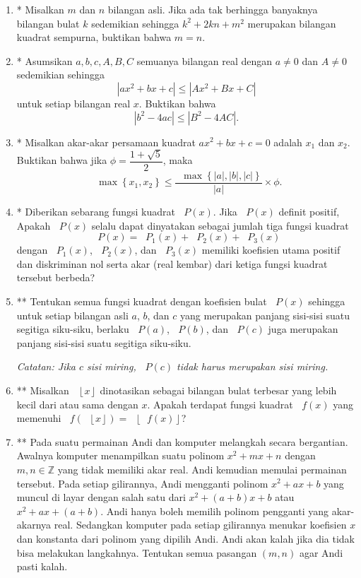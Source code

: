\documentclass[12pt]{article}
\newcommand*\floor[1]{\mathop{}\!\left\lfloor{#1}\right\rfloor}
\newcommand*\func[2]{\mathop{}\!{#1}{\left({#2}\right)}}
\newcommand*\funl[2]{\mathop{}\!{#1}{\left\lbrace{#2}\right\rbrace}}
\begin{document}
\begin{enumerate}[leftmargin=*]
		\item* Misalkan $ m $ dan $ n $ bilangan asli. Jika ada tak berhingga banyaknya bilangan bulat $ k $ sedemikian sehingga $ k^{2} + 2kn + m^{2} $ merupakan bilangan kuadrat sempurna, buktikan bahwa $ m = n $.
		\item* Asumsikan $ a, b, c, A, B, C $ semuanya bilangan real dengan $ a \ne 0 $ dan $ A \ne 0 $ sedemikian sehingga
		\[ \left|ax^{2} + bx + c\right| \leq \left|Ax^{2} + Bx + C\right| \]
		untuk setiap bilangan real $ x $. Buktikan bahwa
		\[ \left|b^{2} - 4ac\right| \leq \left|B^{2} - 4AC\right|. \]
		\item* Misalkan akar-akar persamaan kuadrat $ ax^{2} + bx + c = 0 $ adalah $ x_{1} $ dan $ x_{2} $. Buktikan bahwa jika $ \phi = \dfrac{1 + \sqrt{5}}{2} $, maka
		\[ \funl{\max}{x_{1}, x_{2}} \leq \frac{\funl{\max}{\left|a\right|, \left|b\right|, \left|c\right|}}{\left|a\right|} \times \phi. \]
		\item* Diberikan sebarang fungsi kuadrat $ \func{P}{x} $. Jika $ \func{P}{x} $ definit positif, Apakah $ \func{P}{x} $ selalu dapat dinyatakan sebagai jumlah tiga fungsi kuadrat
		\[ \func{P}{x} = \func{P_{1}}{x} + \func{P_{2}}{x} + \func{P_{3}}{x} \]
		dengan $ \func{P_{1}}{x} $, $ \func{P_{2}}{x} $, dan $ \func{P_{3}}{x} $ memiliki koefisien utama positif dan diskriminan nol serta akar (real kembar) dari ketiga fungsi kuadrat tersebut berbeda?
		\item** Tentukan semua fungsi kuadrat dengan koefisien bulat $ \func{P}{x} $ sehingga untuk setiap bilangan asli $ a $, $ b $, dan $ c $ yang merupakan panjang sisi-sisi suatu segitiga siku-siku, berlaku $ \func{P}{a} $, $ \func{P}{b} $, dan $ \func{P}{c} $ juga merupakan panjang sisi-sisi suatu segitiga siku-siku.
		\par \noindent \textit{Catatan: Jika $ c $ sisi miring, $ \func{P}{c} $ tidak harus merupakan sisi miring.}
		\item** Misalkan $ \floor{x} $ dinotasikan sebagai bilangan bulat terbesar yang lebih kecil dari atau sama dengan $ x $. Apakah terdapat fungsi kuadrat $ \func{f}{x} $ yang memenuhi $ \func{f}{\floor{x}} = \floor{\func{f}{x}} $?
		\item** Pada suatu permainan Andi dan komputer melangkah secara bergantian. Awalnya komputer menampilkan suatu polinom $ x^{2} + mx + n $ dengan $ m, n \in \mathbb{Z} $ yang tidak memiliki akar real. Andi kemudian memulai permainan tersebut. Pada setiap gilirannya, Andi mengganti polinom $ x^{2} + ax + b $ yang muncul di layar dengan salah satu dari $ x^{2} + \left(a + b\right)x + b $ atau $ x^{2} + ax + \left(a + b\right) $. Andi hanya boleh memilih polinom pengganti yang akar-akarnya real. Sedangkan komputer pada setiap gilirannya menukar koefisien $ x $ dan konstanta dari polinom yang dipilih Andi. Andi akan kalah jika dia tidak bisa melakukan langkahnya. Tentukan semua pasangan $ \left(m, n\right) $ agar Andi pasti kalah.

\end{enumerate}
\end{document}
